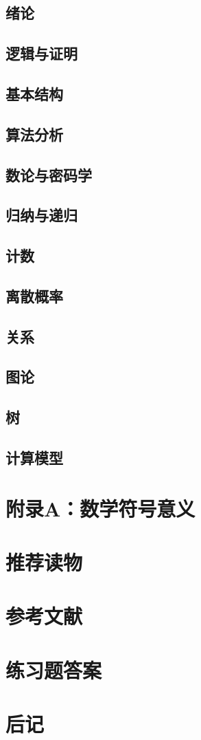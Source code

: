 \documentclass[UTF8]{book}
\begin{document}
        \section{绪论}
        \section{逻辑与证明}
        \section{基本结构}
        \section{算法分析}
        \section{数论与密码学}
        \section{归纳与递归}
        \section{计数}
        \section{离散概率}
        \section{关系}
        \section{图论}
        \section{树}
        \section{计算模型}
    \newpage
    \chapter{附录A：数学符号意义}
    \chapter{推荐读物}
    \chapter{参考文献}
    \chapter{练习题答案}
    \chapter{后记}
\end{document}
